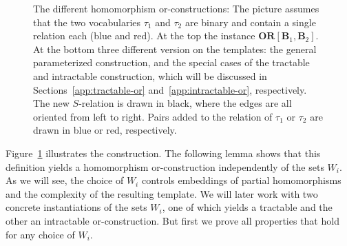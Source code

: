 \documentclass[a4paper,english, thm-restate]{lipics-v2021}
\newcommand{\sig}{\tau}
\newcommand{\StructA}{\mathbf{A}}
\newcommand{\StructB}{\mathbf{B}}
\newcommand{\ORNPC}[1]{\mathbf{OR}_\text{NPC}[#1]}
\newcommand{\OR}[1]{\mathbf{OR}[#1]}
\begin{document}
\begin{figure}
		\caption{The different homomorphism or-constructions:
			The picture assumes that the two vocabularies $\sig_1$ and $\sig_2$
			are binary and contain a single relation each (blue and red).
			At the top the instance $\OR{\StructB_1,\StructB_2}$.
			At the bottom three different version on the templates:
			the general parameterized construction,
			and the special cases of the tractable and intractable construction,
			which will be discussed in Sections~\ref{app:tractable-or} and~\ref{app:intractable-or}, respectively.
			The new $S$-relation is drawn in black,
			where the edges are all oriented from left to right.
			Pairs added to the relation of $\sig_1$ or $\sig_2$
			are drawn in blue or red, respectively.
			\label{fig:hom-or-construction}
		}
	\end{figure}	
	\noindent Figure~\ref{fig:hom-or-construction} illustrates the construction.
	The following lemma shows that this definition yields a homomorphism or-construction independently of the sets $W_i$.
	As we will see, the choice of $W_i$ controls embeddings of partial homomorphisms 
	and the complexity of the resulting template.
	We will later work with two concrete instantiations of the sets $W_i$, one of which yields a tractable and the other an intractable or-construction. But first we prove all properties that hold for any choice of $W_i$.
	
\end{document}
